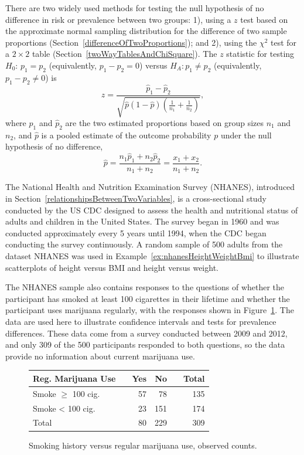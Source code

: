 There are two widely used methods for testing the null hypothesis of no difference in risk or prevalence between two groups: 1), using a $z$ test based on the approximate normal sampling distribution for the difference of two sample proportions (Section~\ref{differenceOfTwoProportions}); and 2), using the $\chi^2$ test for a $2 \times 2$ table (Section~\ref{twoWayTablesAndChiSquare}).   The $z$ statistic for testing $H_0:\, p_1 = p_2$ (equivalently, $p_1 - p_2 = 0$) versus $H_A: p_1 \neq p_2$ (equivalently, $p_1 - p_2 \neq 0$) is
\[z = \dfrac{\hat{p}_1 - \hat{p}_2}{\sqrt{\hat{p}(1-\hat{p})\left(\frac{1}{n_1} + \frac{1}{n_2} \right)}}, \]
where $\hat{p}_1$ and $\hat{p}_2$ are the two estimated proportions based on group sizes $n_1$ and $n_2$, and $\hat{p}$ is a pooled estimate of the outcome probability $p$ under the null hypothesis of no difference,
\[\hat{p} = \dfrac{n_{1}\hat{p}_1 + n_{2}\hat{p}_2}{n_{1} + n_{2}} = \dfrac{x_{1} + x_{2}}{n_{1} + n_{2}}. \]

The National Health and Nutrition Examination Survey (NHANES), introduced in Section~\ref{relationshipsBetweenTwoVariables}, is a cross-sectional study conducted by the US CDC designed to assess the health and nutritional status of adults and children in the United States.  The survey began in 1960 and was conducted approximately every 5 years until 1994, when the CDC began conducting the survey continuously. A random sample of 500 adults from the dataset NHANES was used in Example~\ref{ex:nhanesHeightWeightBmi} to illustrate scatterplots of height versus BMI and height versus weight.

The NHANES sample also contains responses to the questions of whether the participant has smoked at least 100 cigarettes in their lifetime and whether the participant uses marijuana regularly, with the responses shown in Figure~\ref{figure:smoke100RegMarijuana}.  The data are used here to illustrate confidence intervals and tests for prevalence differences.  These data come from a survey conducted between 2009 and 2012, and only 309 of the 500 participants responded to both questions, so the data provide no information about current marijuana use.

\begin{figure}[h]
  \centering
  \begin{tabular}{ll rrr r}
    \hline
    Reg. Marijuana Use  & \hspace{2mm} & Yes & No & \hspace{2mm} & Total \\
    \hline
    Smoke $\geq$ 100 cig. & & 57 & 78 &  & 135  \\
    Smoke < 100 cig. & & 23 & 151 &  &  174  \\
        Total & & 80 & 229 & & 309 \\
    \hline
  \end{tabular}
    \caption{Smoking history versus regular marijuana use, observed counts.}
    \label{figure:smoke100RegMarijuana}
\end{figure}

